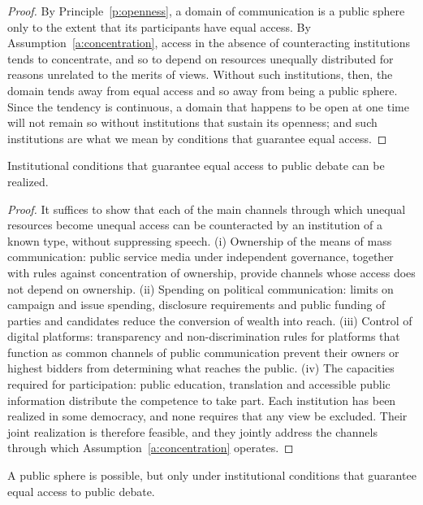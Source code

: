\documentclass{situationist-preprint}
\begin{document}
\begin{proof}
By Principle~\ref{p:openness}, a domain of communication is a public sphere only to the extent that its participants have equal access. By Assumption~\ref{a:concentration}, access in the absence of counteracting institutions tends to concentrate, and so to depend on resources unequally distributed for reasons unrelated to the merits of views. Without such institutions, then, the domain tends away from equal access and so away from being a public sphere. Since the tendency is continuous, a domain that happens to be open at one time will not remain so without institutions that sustain its openness; and such institutions are what we mean by conditions that guarantee equal access.
\end{proof}

\begin{proposition}[Feasibility]\label{p:feasibility}
Institutional conditions that guarantee equal access to public debate can be realized.
\end{proposition}

\begin{proof}
It suffices to show that each of the main channels through which unequal resources become unequal access can be counteracted by an institution of a known type, without suppressing speech. (i) Ownership of the means of mass communication: public service media under independent governance, together with rules against concentration of ownership, provide channels whose access does not depend on ownership. (ii) Spending on political communication: limits on campaign and issue spending, disclosure requirements and public funding of parties and candidates reduce the conversion of wealth into reach. (iii) Control of digital platforms: transparency and non-discrimination rules for platforms that function as common channels of public communication prevent their owners or highest bidders from determining what reaches the public. (iv) The capacities required for participation: public education, translation and accessible public information distribute the competence to take part. Each institution has been realized in some democracy, and none requires that any view be excluded. Their joint realization is therefore feasible, and they jointly address the channels through which Assumption~\ref{a:concentration} operates.
\end{proof}

\begin{theorem}\label{t:main}
A public sphere is possible, but only under institutional conditions that guarantee equal access to public debate.
\end{theorem}
\end{document}
